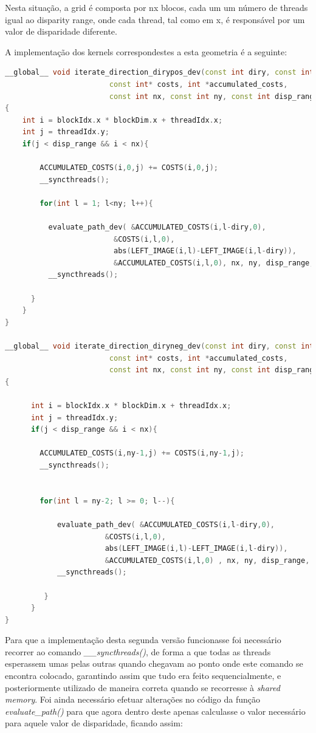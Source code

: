 \documentclass[pdftex,12pt,a4paper]{report}
\begin{document}
Nesta situação, a grid é composta por nx blocos, cada um um número de threads igual ao disparity range, onde cada thread, tal como em x, é responsável por um valor de disparidade diferente.

A implementação dos kernels correspondestes a esta geometria é a seguinte:

 \begin{lstlisting}[language=c++, basicstyle=\scriptsize]
__global__ void iterate_direction_dirypos_dev(const int diry, const int *left_image,
                        const int* costs, int *accumulated_costs,
                        const int nx, const int ny, const int disp_range )
{
    int i = blockIdx.x * blockDim.x + threadIdx.x;
    int j = threadIdx.y;
    if(j < disp_range && i < nx){

        ACCUMULATED_COSTS(i,0,j) += COSTS(i,0,j);
        __syncthreads();

        for(int l = 1; l<ny; l++){

          evaluate_path_dev( &ACCUMULATED_COSTS(i,l-diry,0),
                         &COSTS(i,l,0),
                         abs(LEFT_IMAGE(i,l)-LEFT_IMAGE(i,l-diry)),
                         &ACCUMULATED_COSTS(i,l,0), nx, ny, disp_range, j);
          __syncthreads();

      }
    }
}

__global__ void iterate_direction_diryneg_dev(const int diry, const int *left_image,
                        const int* costs, int *accumulated_costs,
                        const int nx, const int ny, const int disp_range )
{

      int i = blockIdx.x * blockDim.x + threadIdx.x;
      int j = threadIdx.y;
      if(j < disp_range && i < nx){

        ACCUMULATED_COSTS(i,ny-1,j) += COSTS(i,ny-1,j);
        __syncthreads();


        for(int l = ny-2; l >= 0; l--){

            evaluate_path_dev( &ACCUMULATED_COSTS(i,l-diry,0),
                       &COSTS(i,l,0),
                       abs(LEFT_IMAGE(i,l)-LEFT_IMAGE(i,l-diry)),
                       &ACCUMULATED_COSTS(i,l,0) , nx, ny, disp_range, j);
            __syncthreads();

         }
      }
}

\end{lstlisting} 

Para que a implementação desta segunda versão funcionasse foi necessário recorrer ao comando \textit{\_\_syncthreads()}, de forma a que todas as threads esperassem umas pelas outras quando chegavam ao ponto onde este comando se encontra colocado, garantindo assim que tudo era feito sequencialmente, e posteriormente utilizado de maneira correta quando se recorresse à \textit{shared memory}. Foi ainda necessário efetuar alterações no código da função \textit{evaluate\_path()} para que agora dentro deste apenas calculasse o valor necessário para aquele valor de disparidade, ficando assim:
\end{document}
